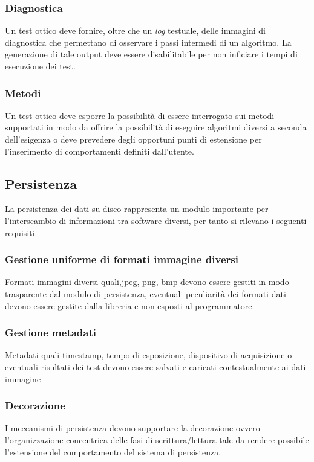 \subsubsection{Diagnostica}
Un test ottico deve fornire, oltre che un \emph{log} testuale, delle immagini di diagnostica che permettano di osservare i passi intermedi di un algoritmo. La generazione di tale output deve essere disabilitabile per non inficiare i tempi di esecuzione dei test.

\subsubsection{Metodi}
Un test ottico deve esporre la possibilità di essere interrogato sui metodi supportati in modo da offrire la possibilità di eseguire algoritmi diversi a seconda dell'esigenza o deve prevedere degli opportuni punti di estensione per l'inserimento di comportamenti definiti dall'utente.


\subsection{Persistenza}
La persistenza dei dati su disco rappresenta un modulo importante per l'interscambio di informazioni tra software diversi, per tanto si rilevano i seguenti requisiti.

\subsubsection{Gestione uniforme di formati immagine diversi}
Formati immagini diversi quali,jpeg, png, bmp devono essere gestiti in modo trasparente dal modulo di persistenza, eventuali peculiarità dei formati dati devono essere gestite dalla libreria e non esposti al programmatore

\subsubsection{Gestione metadati}
Metadati quali timestamp, tempo di esposizione, dispositivo di acquisizione o eventuali risultati dei test devono essere salvati e caricati contestualmente ai dati immagine

\subsubsection{Decorazione}
I meccanismi di persistenza devono supportare la decorazione ovvero l'organizzazione concentrica delle fasi di scrittura/lettura tale da rendere possibile l'estensione del comportamento del sistema di persistenza.

